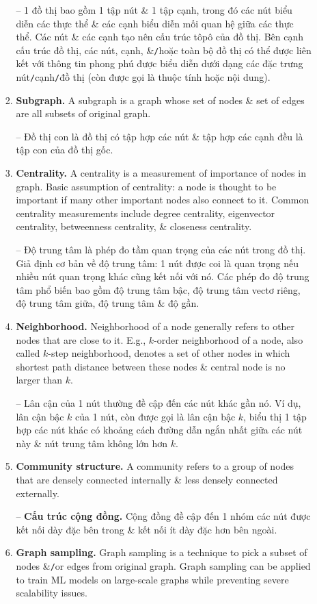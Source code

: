 \documentclass{article}
\begin{document}
\begin{itemize}
\begin{itemize}
\begin{enumerate}
            -- 1 đồ thị bao gồm 1 tập nút \& 1 tập cạnh, trong đó các nút biểu diễn các thực thể \& các cạnh biểu diễn mối quan hệ giữa các thực thể. Các nút \& các cạnh tạo nên cấu trúc tôpô của đồ thị. Bên cạnh cấu trúc đồ thị, các nút, cạnh, \&{\tt/}hoặc toàn bộ đồ thị có thể được liên kết với thông tin phong phú được biểu diễn dưới dạng các đặc trưng nút{\tt/}cạnh{\tt/}đồ thị (còn được gọi là thuộc tính hoặc nội dung).
            \item {\bf Subgraph.} A subgraph is a graph whose set of nodes \& set of edges are all subsets of original graph.

            -- Đồ thị con là đồ thị có tập hợp các nút \& tập hợp các cạnh đều là tập con của đồ thị gốc.
            \item {\bf Centrality.} A centrality is a measurement of importance of nodes in graph. Basic assumption of centrality: a node is thought to be important if many other important nodes also connect to it. Common centrality measurements include degree centrality, eigenvector centrality, betweenness centrality, \& closeness centrality.

            -- Độ trung tâm là phép đo tầm quan trọng của các nút trong đồ thị. Giả định cơ bản về độ trung tâm: 1 nút được coi là quan trọng nếu nhiều nút quan trọng khác cũng kết nối với nó. Các phép đo độ trung tâm phổ biến bao gồm độ trung tâm bậc, độ trung tâm vectơ riêng, độ trung tâm giữa, độ trung tâm \& độ gần.
            \item {\bf Neighborhood.} Neighborhood of a node generally refers to other nodes that are close to it. E.g., $k$-order neighborhood of a node, also called $k$-step neighborhood, denotes a set of other nodes in which shortest path distance between these nodes \& central node is no larger than $k$.

            -- Lân cận của 1 nút thường đề cập đến các nút khác gần nó. Ví dụ, lân cận bậc $k$ của 1 nút, còn được gọi là lân cận bậc $k$, biểu thị 1 tập hợp các nút khác có khoảng cách đường dẫn ngắn nhất giữa các nút này \& nút trung tâm không lớn hơn $k$.
            \item {\bf Community structure.} A community refers to a group of nodes that are densely connected internally \& less densely connected externally.

            -- {\bf Cấu trúc cộng đồng.} Cộng đồng đề cập đến 1 nhóm các nút được kết nối dày đặc bên trong \& kết nối ít dày đặc hơn bên ngoài.
            \item {\bf Graph sampling.} Graph sampling is a technique to pick a subset of nodes \&{\tt/}or edges from original graph. Graph sampling can be applied to train ML models on large-scale graphs while preventing severe scalability issues.


\end{enumerate}
\end{itemize}
\end{itemize}
\end{document}
